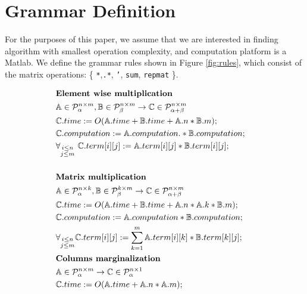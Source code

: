 
\section{Grammar Definition}\label{sec:grammars}
For the purposes of this paper, we assume that we are interested in
finding algorithm with smallest operation complexity, and computation platform
is a Matlab. We define the grammar rules shown in Figure
\ref{fig:rules}, which consist of the 
matrix operations: \{ \texttt{*},\texttt{.*}, \texttt{'},
\texttt{sum}, \texttt{repmat} \}.


\begin{figure}
\begin{framed}
\begin{align*}
&\text{{\bf Element wise multiplication}}\\
&\mathbb{A} \in \mathcal{P}^{n \times m}_\alpha, \mathbb{B} \in \mathcal{P}^{n \times m}_\beta \rightarrow \mathbb{C} \in \mathcal{P}^{n \times m}_{\alpha + \beta} \\
&\mathbb{C}.time := O(\mathbb{A}.time + \mathbb{B}.time + \mathbb{A}.n * \mathbb{B}.m);\\
&\mathbb{C}.computation := \mathbb{A}.computation .* \mathbb{B}.computation;\\
&\forall_{\substack{i \leq n\\j \leq m}}\text{ }\mathbb{C}.term[i][j] := \mathbb{A}.term[i][j] * \mathbb{B}.term[i][j];\\
& \\
&\text{{\bf Matrix multiplication}}\\
&\mathbb{A} \in \mathcal{P}^{n \times k}_\alpha, \mathbb{B} \in \mathcal{P}^{k \times m}_\beta \rightarrow \mathbb{C} \in \mathcal{P}^{n \times m}_{\alpha + \beta} \\
&\mathbb{C}.time := O(\mathbb{A}.time + \mathbb{B}.time + \mathbb{A}.n * \mathbb{A}.k * \mathbb{B}.m);\\
&\mathbb{C}.computation := \mathbb{A}.computation * \mathbb{B}.computation;\\
&\forall_{\substack{i \leq n\\j \leq m}}\mathbb{C}.term[i][j] := \sum_{k = 1}^m \mathbb{A}.term[i][k] * \mathbb{B}.term[k][j];
& \\
&\text{{\bf Columns marginalization}}\\
&\mathbb{A} \in \mathcal{P}^{n \times m}_\alpha \rightarrow \mathbb{C} \in \mathcal{P}^{n \times 1}_\alpha \\
&\mathbb{C}.time := O(\mathbb{A}.time + \mathbb{A}.n * \mathbb{A}.m);\\

\end{align*}
\end{framed}
\end{figure}
